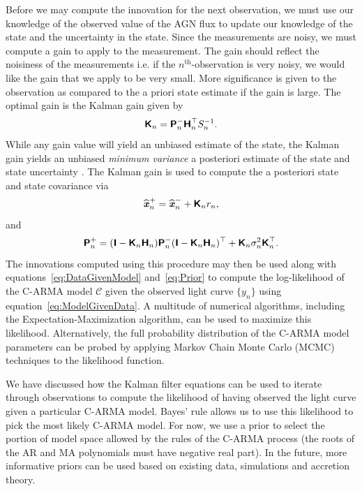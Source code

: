 \documentclass[a4paper,fleqn,usenatbib]{mnras}
\begin{document}
Before we may compute the innovation for the next observation, we must use our knowledge of the observed value of the AGN flux to update our knowledge of the state and the uncertainty in the state. Since the measurements are noisy, we must compute a gain to apply to the measurement. The gain should reflect the noisiness of the measurements i.e. if the $n^{\mathrm{th}}$-observation is very noisy, we would like the gain that we apply to be very small. More significance is given to the observation as compared to the a priori state estimate if the gain is large. The optimal gain is the Kalman gain given by
\begin{equation}\label{eq:KalmanGain}
\textbf{\textsf{K}}_{n} = \textbf{\textsf{P}}^{-}_{n} \textbf{\textsf{H}}_{n}^{\top} S_{n}^{-1}.
\end{equation}
While any gain value will yield an unbiased estimate of the state, the Kalman gain yields an unbiased \textit{minimum variance} a posteriori estimate of the state and state uncertainty \citep[chapter 3.3]{Simon}. The Kalman gain is used to compute the a posteriori state and state covariance via
\begin{equation}\label{eq:APosterioriState}
\widehat{\textbf{\textit{x}}}^{+}_{n} = \widehat{\textbf{\textit{x}}}^{-}_{n} + \textbf{\textsf{K}}_{n} r_{n},
\end{equation}
and
\begin{equation}\label{eq:APosterioriUncertainty}
\textbf{\textsf{P}}^{+}_{n} = (\textbf{\textsf{I}} - \textbf{\textsf{K}}_{n} \textbf{\textsf{H}}_{n}) \textbf{\textsf{P}}^{-}_{n} (\textbf{\textsf{I}} - \textbf{\textsf{K}} _{n} \textbf{\textsf{H}}_{n})^{\top} + \textbf{\textsf{K}}_{n} \sigma^{2}_{n} \textbf{\textsf{K}}_{n}^{\top}.
\end{equation}
The innovations computed using this procedure may then be used along with equations~\eqref{eq:DataGivenModel} and~\eqref{eq:Prior} to compute the log-likelihood of the C-ARMA model $\mathcal{C}$ given the observed light curve $\{y_{n}\}$ using equation~\eqref{eq:ModelGivenData}. A multitude of numerical algorithms, including the Expectation-Maximization algorithm, can be used to maximize this likelihood. Alternatively, the full probability distribution of the C-ARMA model parameters can be probed by applying Markov Chain Monte Carlo (MCMC) techniques to the likelihood function.

We have discussed how the Kalman filter equations can be used to iterate through observations to compute the likelihood of having observed the light curve given a particular C-ARMA model. Bayes' rule allows us to use this likelihood to pick the most likely C-ARMA model. For now, we use a prior to select the portion of model space allowed by the rules of the C-ARMA process (the roots of the AR and MA polynomials must have negative real part). In the future, more informative priors can be used based on existing data, simulations and accretion theory.
\end{document}
